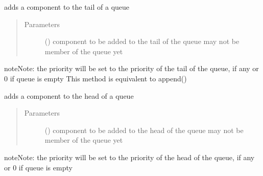 \documentclass[letterpaper,10pt,english]{sphinxmanual}
\begin{document}
\begin{fulllineitems}
\begin{quote}
\begin{description}
\end{description}\end{quote}

\begin{fulllineitems}
\label{\detokenize{Reference:salabim.Queue.add}}
adds a component to the tail of a queue
\begin{quote}\begin{description}
\item[{Parameters}] \leavevmode
{} ({\hyperref[\detokenize{Reference:salabim.Component}]{}}) \textendash{} component to be added to the tail of the queue 
may not be member of the queue yet

\end{description}\end{quote}

\begin{sphinxadmonition}{note}{Note:}
the priority will be set to
the priority of the tail of the queue, if any
or 0 if queue is empty 
This method is equivalent to append()
\end{sphinxadmonition}

\end{fulllineitems}


\begin{fulllineitems}
\label{\detokenize{Reference:salabim.Queue.add_at_head}}
adds a component to the head of a queue
\begin{quote}\begin{description}
\item[{Parameters}] \leavevmode
{} ({\hyperref[\detokenize{Reference:salabim.Component}]{}}) \textendash{} component to be added to the head of the queue 
may not be member of the queue yet

\end{description}\end{quote}

\begin{sphinxadmonition}{note}{Note:}
the priority will be set to
the priority of the head of the queue, if any
or 0 if queue is empty
\end{sphinxadmonition}


\end{fulllineitems}
\end{fulllineitems}
\end{document}
